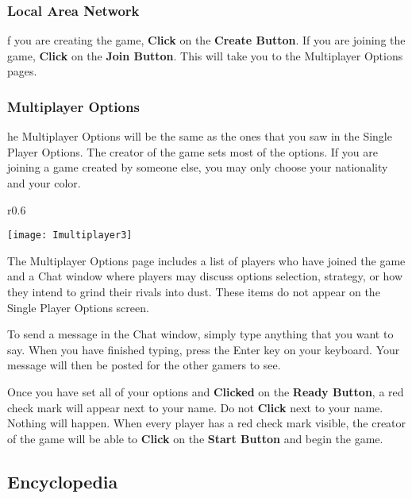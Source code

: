 \subsubsection{Local Area Network}

f you are creating the game, \textbf{Click} on the \textbf{Create Button}. If you are joining the game, \textbf{Click} on the \textbf{Join Button}. This will take you to the Multiplayer Options pages.

\subsubsection{Multiplayer Options}

he Multiplayer Options will be the same as the ones that you saw in the Single Player Options. The creator of the game sets most of the options. If you are joining a game created by someone else, you may only choose your nationality and your color.

\begin{wrapfigure}{r}{0.6\textwidth}
	\begin{center}
		\vspace{-20pt}
		\texttt{[image: Imultiplayer3]} %
	\end{center}
	\vspace{-20pt}
\end{wrapfigure}

The Multiplayer Options page includes a list of players who have joined the game and a Chat window where players may discuss options selection, strategy, or how they intend to grind their rivals into dust. These items do not appear on the Single Player Options screen.


To send a message in the Chat window, simply type anything that you want to say. When you have finished typing, press the Enter key on your keyboard. Your message will then be posted for the other gamers to see.

Once you have set all of your options and \textbf{Clicked} on the \textbf{Ready Button}, a red check mark will appear next to your name. Do not \textbf{Click} next to your name. Nothing will happen. When every player has a red check mark visible, the creator of the game will be able to \textbf{Click} on the \textbf{Start Button} and begin the game.

\subsection{Encyclopedia}

